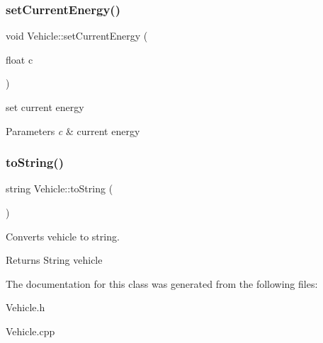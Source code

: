 \subsubsection{\texorpdfstring{set\+Current\+Energy()}{setCurrentEnergy()}}
{\footnotesize\ttfamily void Vehicle\+::set\+Current\+Energy (\begin{DoxyParamCaption}\item[{float}]{c }\end{DoxyParamCaption})}



set current energy 


\begin{DoxyParams}{Parameters}
{\em c} & current energy \\
\hline
\end{DoxyParams}
\mbox{\label{class_vehicle_abd9381537867c1a98430ab06ce51898f}} 
\subsubsection{\texorpdfstring{to\+String()}{toString()}}
{\footnotesize\ttfamily string Vehicle\+::to\+String (\begin{DoxyParamCaption}{ }\end{DoxyParamCaption})}



Converts vehicle to string. 

\begin{DoxyReturn}{Returns}
String vehicle 
\end{DoxyReturn}


The documentation for this class was generated from the following files\+:\begin{DoxyCompactItemize}
\item 
Vehicle.\+h\item 
Vehicle.\+cpp\end{DoxyCompactItemize}
